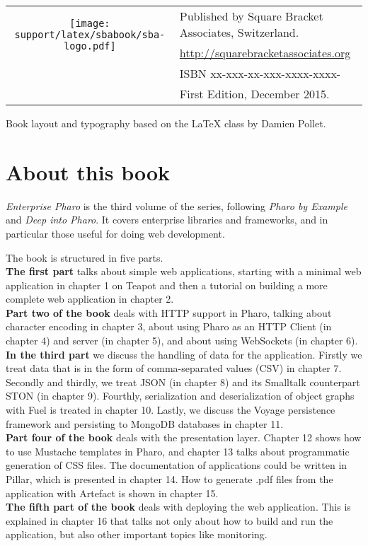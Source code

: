 \documentclass[10pt,twoside,english,showtrims]{support/latex/sbabook/sbabook}
\begin{document}
{  \vfill

  \begin{tabular}{@{}c@{\quad}l}
    \multirow{2}{*}{\texttt{[image: support/latex/sbabook/sba-logo.pdf]}}
    & Published by Square Bracket Associates, Switzerland. \\
    & \url{http://squarebracketassociates.org} \\[\smallskipamount]
    & ISBN xx-xxx-xx-xxx-xxxx-xxxx- \\
    & First Edition, December 2015. \\
  \end{tabular}
  \medskip

  Book layout and typography based on the  \LaTeX{} class by Damien Pollet.
}


\frontmatter
\pagestyle{plain}


\chapter*{About this book}

\emph{Enterprise Pharo} is the third volume of the series, following
\emph{Pharo by Example} and \emph{Deep into Pharo}. It covers
enterprise libraries and frameworks, and in particular those useful for
doing web development.

The book is structured in five parts.\\
\textbf{The first part} talks about simple web applications, starting
with a minimal web application in chapter 1 on Teapot and then a
tutorial on building a more complete web application in chapter 2.\\
\textbf{Part two of the book} deals with HTTP support in Pharo,
talking about character encoding in chapter 3, about using Pharo as an
HTTP Client (in chapter 4) and server (in chapter 5), and about using
WebSockets (in chapter 6).\\
\textbf{In the third part} we discuss the handling of data for the
application. Firstly we treat data that is in the form of
comma-separated values (CSV) in chapter 7. Secondly and thirdly, we
treat JSON (in chapter 8) and its Smalltalk counterpart STON (in
chapter 9). Fourthly, serialization and deserialization of object
graphs with Fuel is treated in chapter 10. Lastly, we discuss the
Voyage persistence framework and persisting to MongoDB databases in
chapter 11.\\
\textbf{Part four of the book} deals with the presentation layer.
Chapter 12 shows how to use Mustache templates in Pharo, and chapter
13 talks about programmatic generation of CSS files. The documentation
of applications could be written in Pillar, which is presented in
chapter 14. How to generate .pdf files from the application with
Artefact is shown in chapter 15.\\
\textbf{The fifth part of the book} deals with deploying the web
application. This is explained in chapter 16 that talks not only about
how to build and run the application, but also other important topics
like monitoring.
\end{document}
